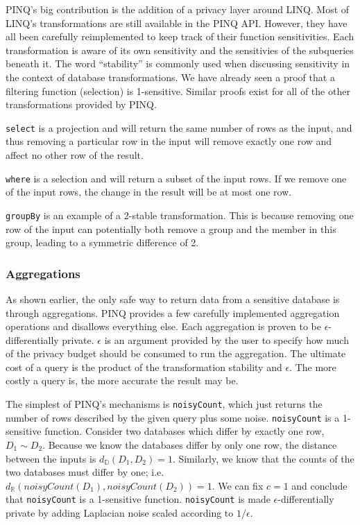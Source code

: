 \documentclass[12pt]{article}
\begin{document}
PINQ's big contribution is the addition of a privacy layer around LINQ.
Most of LINQ's transformations are still available in the PINQ API.
However, they have all been carefully reimplemented to keep track of their function sensitivities.
Each transformation is aware of its own sensitivity and the sensitivies of the subqueries beneath it.
The word ``stability'' is commonly used when discussing sensitivity in the context of database transformations.
We have already seen a proof that a filtering function (selection) is 1-sensitive.
Similar proofs exist for all of the other transformations provided by PINQ.


\texttt{select} is a projection and will return the same number of rows as the input, and thus removing a particular row in the input will remove exactly one row and affect no other row of the result.

\texttt{where} is a selection and will return a subset of the input rows.
If we remove one of the input rows, the change in the result will be at most one row.

\texttt{groupBy} is an example of a 2-stable transformation.
This is because removing one row of the input can potentially both remove a group and the member in this group, leading to a symmetric difference of 2.

\subsubsection{Aggregations}

As shown earlier, the only safe way to return data from a sensitive database is through aggregations.
PINQ provides a few carefully implemented aggregation operations and disallows everything else.
Each aggregation is proven to be $\epsilon$-differentially private.
$\epsilon$ is an argument provided by the user to specify how much of the privacy budget should be consumed to run the aggregation.
The ultimate cost of a query is the product of the transformation stability and $\epsilon$.
The more costly a query is, the more accurate the result may be.

The simplest of PINQ's mechanisms is \texttt{noisyCount}, which just returns the number of rows described by the given query plus some noise.
\texttt{noisyCount} is a 1-sensitive function.
Consider two databases which differ by exactly one row, $D_1 \sim D_2$.
Because we know the databases differ by only one row, the distance between the inputs is $d_{\mathbb D}(D_1,D_2)=1$.
Similarly, we know that the counts of the two databases must differ by one; i.e. $d_{\mathbb R}(noisyCount(D_1),noisyCount(D_2))=1$.
We can fix $c=1$ and conclude that \texttt{noisyCount} is a 1-sensitive function.
\texttt{noisyCount} is made $\epsilon$-differentially private by adding Laplacian noise scaled according to $1/\epsilon$.
\end{document}
